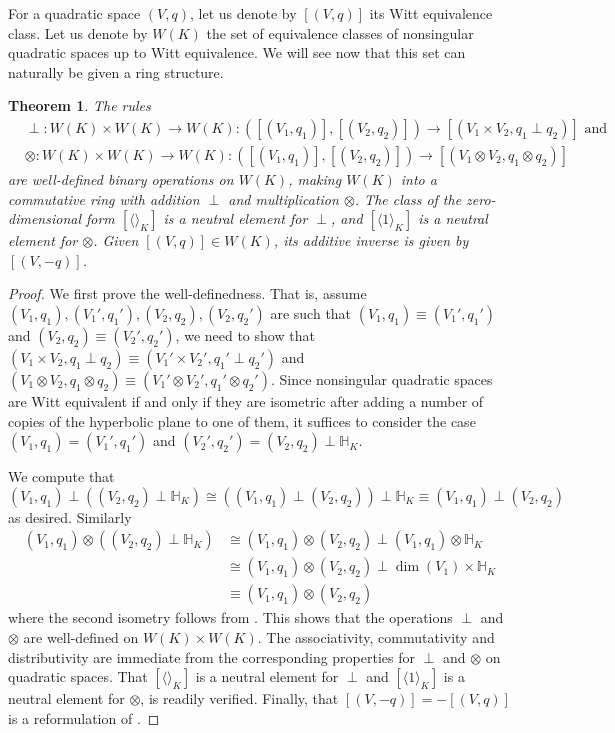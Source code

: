 \documentclass[12pt, leqno, british]{amsart}
\theoremstyle{definition}
\theoremstyle{plain}
\newtheorem{thm}[defi]{Theorem}
\theoremstyle{remark}
\newcommand{\mbb}{\mathbb}
\begin{document}
For a quadratic space $(V, q)$, let us denote by $[(V, q)]$ its Witt equivalence class.
Let us denote by $W(K)$ the set of equivalence classes of nonsingular quadratic spaces up to Witt equivalence.
We will see now that this set can naturally be given a ring structure.
\begin{thm}\label{T:WittRing}
The rules
\begin{align*}
&\perp : W(K) \times W(K) \to W(K) : ([(V_1, q_1)], [(V_2, q_2)]) \to [(V_1 \times V_2, q_1 \perp q_2)] \text{ and}\\
&\otimes : W(K) \times W(K) \to W(K) : ([(V_1, q_1)], [(V_2, q_2)]) \to [(V_1 \otimes V_2, q_1 \otimes q_2)]
\end{align*}
are well-defined binary operations on $W(K)$, making $W(K)$ into a commutative ring with addition $\perp$ and multiplication $\otimes$.
The class of the zero-dimensional form $[\langle \rangle_K]$ is a neutral element for $\perp$, and $[\langle 1 \rangle_K]$ is a neutral element for $\otimes$.
Given $[(V, q)] \in W(K)$, its additive inverse is given by $[(V, -q)]$.
\end{thm}
\begin{proof}
We first prove the well-definedness.
That is, assume $(V_1, q_1), (V_1', q_1'), (V_2, q_2), (V_2, q_2')$ are such that $(V_1, q_1) \equiv (V_1', q_1')$ and $(V_2, q_2) \equiv (V_2', q_2')$, we need to show that $(V_1 \times V_2, q_1 \perp q_2) \equiv (V_1' \times V_2', q_1' \perp q_2')$ and $(V_1 \otimes V_2, q_1 \otimes q_2) \equiv (V_1' \otimes V_2', q_1' \otimes q_2')$.
Since nonsingular quadratic spaces are Witt equivalent if and only if they are isometric after adding a number of copies of the hyperbolic plane to one of them, it suffices to consider the case $(V_1, q_1) = (V_1', q_1')$ and $(V_2', q_2') = (V_2, q_2) \perp \mbb{H}_K$.

We compute that
\begin{displaymath}
(V_1, q_1) \perp ((V_2, q_2) \perp \mbb{H}_K) \cong ((V_1, q_1) \perp (V_2, q_2)) \perp \mbb{H}_K \equiv (V_1, q_1) \perp (V_2, q_2)
\end{displaymath}
as desired.
Similarly
\begin{align*}
(V_1, q_1) \otimes ((V_2, q_2) \perp \mbb{H}_K) &\cong (V_1, q_1) \otimes (V_2, q_2) \perp (V_1, q_1) \otimes \mbb{H}_K \\
&\cong (V_1, q_1) \otimes (V_2, q_2) \perp \dim(V_1) \times \mbb{H}_K \\
&\equiv (V_1, q_1) \otimes (V_2, q_2)
\end{align*}
where the second isometry follows from .
This shows that the operations $\perp$ and $\otimes$ are well-defined on $W(K) \times W(K)$.
The associativity, commutativity and distributivity are immediate from the corresponding properties for $\perp$ and $\otimes$ on quadratic spaces.
That $[\langle \rangle_K]$ is a neutral element for $\perp$ and $[\langle 1 \rangle_K]$ is a neutral element for $\otimes$, is readily verified.
Finally, that $[(V, -q)] = -[(V, q)]$ is a reformulation of .
\end{proof}
\end{document}
